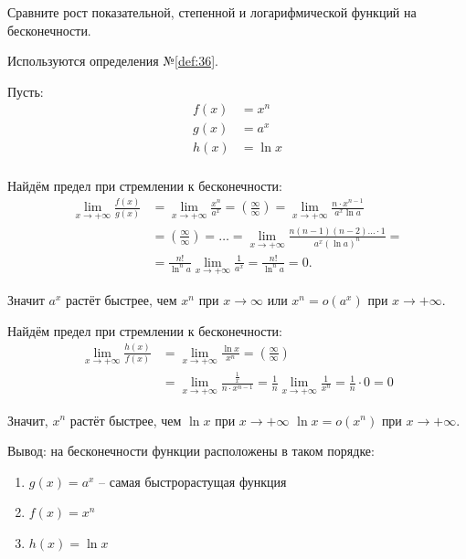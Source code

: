 \begin{question}
    Сравните рост показательной, степенной и логарифмической функций на бесконечности.
\end{question}
\begin{used}
    Используются определения №\ref{def:36}.
\end{used}
\begin{answer}
    Пусть:
    \begin{align*}
        f(x) &= x^n \\
        g(x) &= a^x \\
        h(x) &= \ln x \\
    \end{align*}

    Найдём предел при стремлении к бесконечности:
    \begin{align*}
        \lim_{x \to +\infty} \frac{f(x)}{g(x)} &= \lim_{x \to +\infty} \frac{x^n}{a^x} = \left( \frac{\infty}{\infty} \right) = \lim_{x \to +\infty} \frac{n \cdot x ^ {n-1}}{a^x \ln a} \\
            &= \left( \frac{\infty}{\infty} \right) = \ldots = \lim_{x \to +\infty} \frac{n(n-1)(n-2)\ldots \cdot 1}{a^x(\ln a)^n} = \\
            &= \frac{n!}{\ln^n a} \lim_{x \to +\infty} \frac{1}{a^x} = \frac{n!}{\ln^n a} = 0.
    \end{align*}

    Значит $a^x$ растёт быстрее, чем  $x^n$ при $x \to \infty$ или $x^n = o(a^x)$ при $x \to +\infty$.

    Найдём предел при стремлении к бесконечности:
    \begin{align*}
        \lim_{x \to +\infty} \frac{h(x)}{f(x)} &= \lim_{x \to +\infty} \frac{\ln x}{x^n} = \left( \frac{\infty}{\infty} \right) \\
            &= \lim_{x \to +\infty}  \frac{\frac{1}{x}}{n \cdot x^{n-1}} = \frac{1}{n} \lim_{x \to +\infty} \frac{1}{x^n} = \frac{1}{n} \cdot 0 = 0
    \end{align*}

    Значит, $x^n$ растёт быстрее, чем  $\ln x$ при $x\to +\infty$ $\ln x = o(x^n)$ при $x \to  +\infty$.

    Вывод: на бесконечности функции расположены в таком порядке:
    \begin{enumerate}
        \item $g(x) = a^x$ -- самая быстрорастущая функция
        \item $f(x) = x^n$
        \item $h(x) = \ln x$
    \end{enumerate}
\end{answer}
\pagebreak



